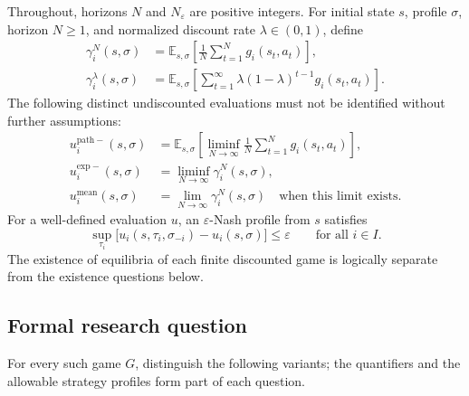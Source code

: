 \documentclass[11pt,a4paper]{article}
\newcommand{\E}{\mathbb E}
\begin{document}
Throughout, horizons $N$ and $N_\varepsilon$ are positive integers.
For initial state $s$, profile $\sigma$, horizon $N\ge1$, and normalized
discount rate $\lambda\in(0,1)$, define
\[
\begin{aligned}
	\gamma_i^N(s,\sigma)
	&=\E_{s,\sigma}\!\left[\frac1N\sum_{t=1}^{N}g_i(s_t,a_t)\right],\\
	\gamma_i^\lambda(s,\sigma)
	&=\E_{s,\sigma}\!\left[\sum_{t=1}^\infty
	\lambda(1-\lambda)^{t-1}g_i(s_t,a_t)\right].
\end{aligned}
\]
The following distinct undiscounted evaluations must not be identified
without further assumptions:
\[
\begin{aligned}
	u_i^{\mathrm{path}-}(s,\sigma)
	&=\E_{s,\sigma}\!\left[\liminf_{N\to\infty}
	\frac1N\sum_{t=1}^N g_i(s_t,a_t)\right],\\
	u_i^{\mathrm{exp}-}(s,\sigma)
	&=\liminf_{N\to\infty}\gamma_i^N(s,\sigma),\\
	u_i^{\mathrm{mean}}(s,\sigma)
	&=\lim_{N\to\infty}\gamma_i^N(s,\sigma)
	\quad\text{when this limit exists}.
\end{aligned}
\]
For a well-defined evaluation $u$, an $\varepsilon$-Nash profile
from $s$ satisfies
\[
\sup_{\tau_i}
\bigl[u_i(s,\tau_i,\sigma_{-i})-u_i(s,\sigma)\bigr]
\le\varepsilon\qquad\text{for all }i\in I.
\]
The existence of equilibria of each finite discounted game is
logically separate from the existence questions below.

\subsection*{Formal research question}

For every such game $G$, distinguish the following variants; the
quantifiers and the allowable strategy profiles form part of each
question.
\end{document}
